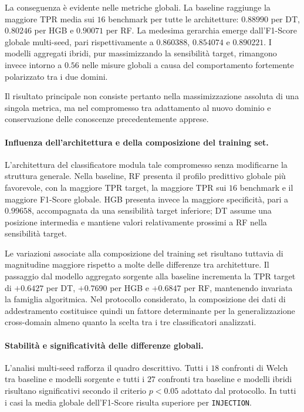 La conseguenza è evidente nelle metriche globali. 
La baseline raggiunge la maggiore TPR media sui $16$ benchmark per tutte le architetture: $0.88990$ per DT, $0.80246$ per HGB e $0.90071$ per RF. 
La medesima gerarchia emerge dall'F1-Score globale multi-seed, pari rispettivamente a $0.860388$, $0.854074$ e $0.890221$. 
I modelli aggregati ibridi, pur massimizzando la sensibilità target, rimangono invece intorno a $0.56$ nelle misure globali a causa del comportamento fortemente polarizzato tra i due domini.

Il risultato principale non consiste pertanto nella massimizzazione assoluta di una singola metrica, ma nel compromesso tra adattamento al nuovo dominio e conservazione delle conoscenze precedentemente apprese.

\paragraph{Influenza dell'architettura e della composizione del training set.}
L'architettura del classificatore modula tale compromesso senza modificarne la struttura generale. 
Nella baseline, RF presenta il profilo predittivo globale più favorevole, con la maggiore TPR target, la maggiore TPR sui $16$ benchmark e il maggiore F1-Score globale. 
HGB presenta invece la maggiore specificità, pari a $0.99658$, accompagnata da una sensibilità target inferiore; DT assume una posizione intermedia e mantiene valori relativamente prossimi a RF nella sensibilità target.

Le variazioni associate alla composizione del training set risultano tuttavia di magnitudine maggiore rispetto a molte delle differenze tra architetture.
Il passaggio dal modello aggregato sorgente alla baseline incrementa la TPR target di $+0.6427$ per DT, $+0.7690$ per HGB e $+0.6847$ per RF, mantenendo invariata la famiglia algoritmica. 
Nel protocollo considerato, la composizione dei dati di addestramento costituisce quindi un fattore determinante per la generalizzazione cross-domain almeno quanto la scelta tra i tre classificatori analizzati.

\paragraph{Stabilità e significatività delle differenze globali.}
L'analisi multi-seed rafforza il quadro descrittivo. 
Tutti i $18$ confronti di Welch tra baseline e modelli sorgente e tutti i $27$ confronti tra baseline e modelli ibridi risultano significativi secondo il criterio $p<0.05$ adottato dal protocollo. 
In tutti i casi la media globale dell'F1-Score risulta superiore per \texttt{INJECTION}.

